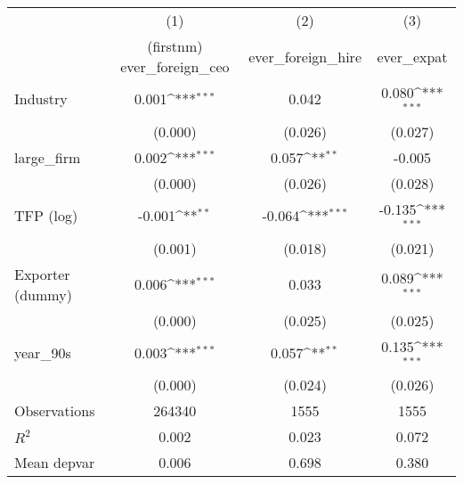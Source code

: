 {
\def\sym#1{\ifmmode^{#1}\else\(^{#1}\)\fi}
\begin{tabular}{l*{3}{c}}
\hline\hline
                    &\multicolumn{1}{c}{(1)}&\multicolumn{1}{c}{(2)}&\multicolumn{1}{c}{(3)}\\
                    &\multicolumn{1}{c}{(firstnm) ever\_foreign\_ceo}&\multicolumn{1}{c}{ever\_foreign\_hire}&\multicolumn{1}{c}{ever\_expat}\\
\hline
Industry            &       0.001\sym{***}&       0.042         &       0.080\sym{***}\\
                    &     (0.000)         &     (0.026)         &     (0.027)         \\
[1em]
large\_firm          &       0.002\sym{***}&       0.057\sym{**} &      -0.005         \\
                    &     (0.000)         &     (0.026)         &     (0.028)         \\
[1em]
TFP (log)           &      -0.001\sym{**} &      -0.064\sym{***}&      -0.135\sym{***}\\
                    &     (0.001)         &     (0.018)         &     (0.021)         \\
[1em]
Exporter (dummy)    &       0.006\sym{***}&       0.033         &       0.089\sym{***}\\
                    &     (0.000)         &     (0.025)         &     (0.025)         \\
[1em]
year\_90s            &       0.003\sym{***}&       0.057\sym{**} &       0.135\sym{***}\\
                    &     (0.000)         &     (0.024)         &     (0.026)         \\
\hline
Observations        &      264340         &        1555         &        1555         \\
\(R^{2}\)           &       0.002         &       0.023         &       0.072         \\
Mean depvar         &       0.006         &       0.698         &       0.380         \\
\hline\hline
\end{tabular}
}
